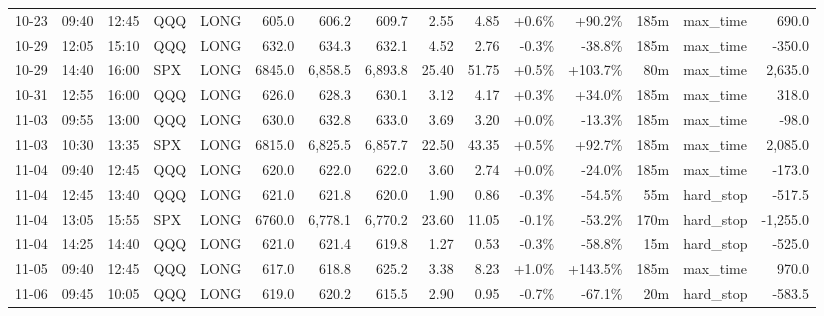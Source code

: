\documentclass[11pt,a4paper,twoside]{article}
\begin{document}
\begin{landscape}
\begin{center}
\begin{longtable}{>{\color{txtmain}}l l l l l r r r r r r r r >{\color{txtmain}}l r}
10-23 & 09:40 & 12:45 & QQQ & LONG & 605.0 & 606.2 & 609.7 & 2.55 & 4.85 & \textcolor{wingreen}{+0.6\%} & \textcolor{wingreen}{+90.2\%} & 185m & max\_time & \textcolor{wingreen}{690.0} \\
10-29 & 12:05 & 15:10 & QQQ & LONG & 632.0 & 634.3 & 632.1 & 4.52 & 2.76 & \textcolor{lossred}{-0.3\%} & \textcolor{lossred}{-38.8\%} & 185m & max\_time & \textcolor{lossred}{-350.0} \\
10-29 & 14:40 & 16:00 & SPX & LONG & 6845.0 & 6,858.5 & 6,893.8 & 25.40 & 51.75 & \textcolor{wingreen}{+0.5\%} & \textcolor{wingreen}{+103.7\%} & 80m & max\_time & \textcolor{wingreen}{2,635.0} \\
10-31 & 12:55 & 16:00 & QQQ & LONG & 626.0 & 628.3 & 630.1 & 3.12 & 4.17 & \textcolor{wingreen}{+0.3\%} & \textcolor{wingreen}{+34.0\%} & 185m & max\_time & \textcolor{wingreen}{318.0} \\
11-03 & 09:55 & 13:00 & QQQ & LONG & 630.0 & 632.8 & 633.0 & 3.69 & 3.20 & \textcolor{wingreen}{+0.0\%} & \textcolor{lossred}{-13.3\%} & 185m & max\_time & \textcolor{lossred}{-98.0} \\
11-03 & 10:30 & 13:35 & SPX & LONG & 6815.0 & 6,825.5 & 6,857.7 & 22.50 & 43.35 & \textcolor{wingreen}{+0.5\%} & \textcolor{wingreen}{+92.7\%} & 185m & max\_time & \textcolor{wingreen}{2,085.0} \\
11-04 & 09:40 & 12:45 & QQQ & LONG & 620.0 & 622.0 & 622.0 & 3.60 & 2.74 & \textcolor{wingreen}{+0.0\%} & \textcolor{lossred}{-24.0\%} & 185m & max\_time & \textcolor{lossred}{-173.0} \\
11-04 & 12:45 & 13:40 & QQQ & LONG & 621.0 & 621.8 & 620.0 & 1.90 & 0.86 & \textcolor{lossred}{-0.3\%} & \textcolor{lossred}{-54.5\%} & 55m & hard\_stop & \textcolor{lossred}{-517.5} \\
11-04 & 13:05 & 15:55 & SPX & LONG & 6760.0 & 6,778.1 & 6,770.2 & 23.60 & 11.05 & \textcolor{lossred}{-0.1\%} & \textcolor{lossred}{-53.2\%} & 170m & hard\_stop & \textcolor{lossred}{-1,255.0} \\
11-04 & 14:25 & 14:40 & QQQ & LONG & 621.0 & 621.4 & 619.8 & 1.27 & 0.53 & \textcolor{lossred}{-0.3\%} & \textcolor{lossred}{-58.8\%} & 15m & hard\_stop & \textcolor{lossred}{-525.0} \\
11-05 & 09:40 & 12:45 & QQQ & LONG & 617.0 & 618.8 & 625.2 & 3.38 & 8.23 & \textcolor{wingreen}{+1.0\%} & \textcolor{wingreen}{+143.5\%} & 185m & max\_time & \textcolor{wingreen}{970.0} \\
11-06 & 09:45 & 10:05 & QQQ & LONG & 619.0 & 620.2 & 615.5 & 2.90 & 0.95 & \textcolor{lossred}{-0.7\%} & \textcolor{lossred}{-67.1\%} & 20m & hard\_stop & \textcolor{lossred}{-583.5} \\

\end{longtable}
\end{center}
\end{landscape}
\end{document}
